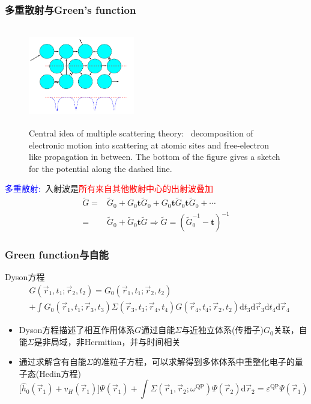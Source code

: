 \documentclass[cjk,slidestop,compress,mathserif,blue]{beamer}
\begin{document}
\frame
{
	\frametitle{多重散射与\textrm{Green's function}}
\begin{figure}[h!]
	\vspace{-40pt}
\centering
\includegraphics[height=1.70in,width=1.82in,viewport=5 0 515 495,clip]{Figures/multiple-scattering_theory.png}
\caption{\tiny \textrm{Central idea of multiple scattering theory:~ decomposition of electronic motion into scattering at atomic sites and free-electron like propagation in between. The bottom of the figure gives a sketch for the potential along the dashed line.}}
\label{Multi-scattering}
\end{figure}
\textcolor{blue}{多重散射:~}入射波是\textcolor{red}{所有来自其他散射中心的出射波叠加}
			\begin{displaymath}
				\begin{aligned}
					\tilde G=&\tilde G_0+G_0\mathbf{t}\tilde G_0+G_0\mathbf{t}\tilde G_0\mathbf{t}\tilde G_0+\cdots\\
					=&\tilde G_0+\tilde G_0\mathbf{t}\tilde G \Longrightarrow \tilde G=(\tilde G_0^{-1}-\mathbf{t})^{-1}
				\end{aligned}
			\end{displaymath}
}

\frame
{
	\frametitle{\textrm{Green function}与自能}
	\textrm{Dyson}方程
	\begin{displaymath}
		\begin{aligned}
	&G(\vec r_1,t_1;\vec r_2,t_2)=G_0(\vec r_1,t_1;\vec r_2,t_2)\\
	&+\int G_0(\vec r_1,t_1;\vec r_3,t_3)\Sigma(\vec r_3,t_3;\vec r_4,t_4)G(\vec r_4,t_4;\vec r_2,t_2)\mathrm{d}t_3\mathrm{d}\vec r_3\mathrm{d}t_4\mathrm{d}\vec r_4
		\end{aligned}
	\end{displaymath}
	\begin{itemize}
		\item \textrm{Dyson}方程描述了相互作用体系$G$通过自能$\Sigma$与近独立体系(传播子)$G_0$关联，自能$\Sigma$是非局域，非\textrm{Hermitian}，并与时间相关
		\item 通过求解含有自能$\Sigma$的准粒子方程，可以求解得到多体体系中重整化电子的量子态(\textrm{Hedin}方程)
			$$\bigg[\hat h_0(\vec r_1)+v_H(\vec r_1)\bigg]\Psi(\vec r_1)+\int\Sigma(\vec r_1,\vec r_2;\omega^{\mathrm{QP}})\Psi(\vec r_2)\mathrm{d}\vec r_2=\varepsilon^{\mathrm{QP}}\Psi(\vec r_1)$$
	\end{itemize}
}
\end{document}
